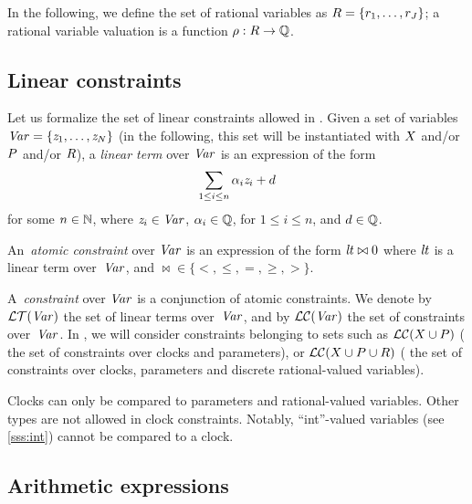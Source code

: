 In the following, we define the set of rational variables as $R = \{ r_1, \dots, r_J \} $;
a rational variable valuation is a function $\rho : R \rightarrow \mathbb Q$.



\subsection{Linear constraints}\label{ss:constraints}

Let us formalize the set of linear constraints allowed in \imitator{}.
Given a set of variables~$\mathit{Var} = \{ \mathit{z}_1, \dots, \mathit{z}_N \}$ (in the following, this set will be instantiated with $X$ and/or $P$ and/or $R$), a \emph{linear term} over $\mathit{Var}$ is an expression of the form
$$
	\sum_{1 \leq i \leq n} \alpha_i \mathit{z}_i + d
$$
for some $n \in \mathbb N$,
where
$\mathit{z}_{i} \in \mathit{Var}$,
$\alpha_{i} \in \mathbb Q$, for $1 \leq i \leq n$,
and
$d \in \mathbb Q$.

An~\emph{atomic constraint} over $\mathit{Var}$ is an expression of the form
$
	\mathit{lt} \bowtie 0
$
where
$\mathit{lt}$ is a linear term over~$\mathit{Var}$,
and
${\bowtie} \in \{ <, \leq, =, \geq, > \}$.

A~\emph{constraint} over $\mathit{Var}$ is a conjunction of atomic constraints.
We denote by $\mathcal{LT}(\mathit{Var})$ the set of linear terms over~$\mathit{Var}$, and by $\mathcal{LC}(\mathit{Var})$ the set of constraints over~$\mathit{Var}$.
In \imitator{}, we will consider constraints belonging to sets such as $\mathcal{LC}(X \cup P)$ (\ie{} the set of constraints over clocks and parameters), or $\mathcal{LC}(X \cup P \cup R)$ (\ie{} the set of constraints over clocks, parameters and discrete rational-valued variables).

\begin{becareful}
	Clocks can only be compared to parameters and rational-valued variables.
	Other types are not allowed in clock constraints.
	Notably, ``int''-valued variables (see \cref{sss:int}) cannot be compared to a clock.
\end{becareful}


\subsection{Arithmetic expressions}

